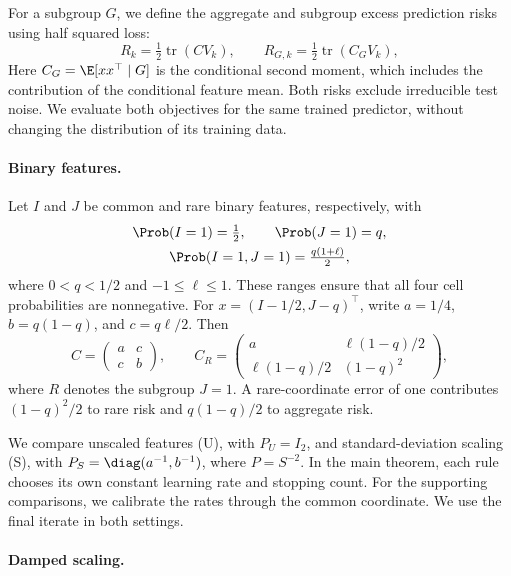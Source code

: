 For a subgroup $G$, we define the aggregate and subgroup excess prediction risks
using half squared loss:
\begin{equation}
  R_k = \tfrac12\operatorname{tr}(CV_k),\qquad R_{G,k}
      = \tfrac12\operatorname{tr}(C_GV_k), \label{eq:conference-risks}
\end{equation}
Here $C_G = \E[xx^\top\mid G]$ is the conditional second moment, which includes
the contribution of the conditional feature mean. Both risks exclude irreducible
test noise. We evaluate both objectives for the same trained predictor, without
changing the distribution of its training data.

\paragraph{Binary features.}

Let $I$ and $J$ be common and rare binary features, respectively, with
\[
  \begin{gathered}
    \Prob(I = 1) = \tfrac12,\qquad \Prob(J = 1) = q, \\
    \Prob(I = 1,J = 1) = \tfrac{q(1+\ell)}2,
  \end{gathered}
\]
where $0 < q < 1/2$ and $-1 \leq \ell \leq 1$. These ranges ensure that all four
cell probabilities are nonnegative. For $x = (I - 1/2,J - q)^\top$, write
$a = 1/4$, $b = q(1 - q)$, and $c = q\ell/2$. Then
\[
  C = \begin{pmatrix}
        a & c \\
        c & b
      \end{pmatrix},\qquad C_R
    = \begin{pmatrix}
        a             & \ell(1 - q)/2 \\
        \ell(1 - q)/2 & (1 - q)^2
      \end{pmatrix},
\]
where $R$ denotes the subgroup $J = 1$. A rare-coordinate error of one
contributes $(1 - q)^2/2$ to rare risk and $q(1 - q)/2$ to aggregate risk.

We compare unscaled features (U), with $P_U = I_2$, and standard-deviation
scaling (S), with $P_S = \diag(a^{-1},b^{-1})$, where $P = S^{-2}$. In the main
theorem, each rule chooses its own constant learning rate and stopping count.
For the supporting comparisons, we calibrate the rates through the common
coordinate. We use the final iterate in both settings.

\paragraph{Damped scaling.}

